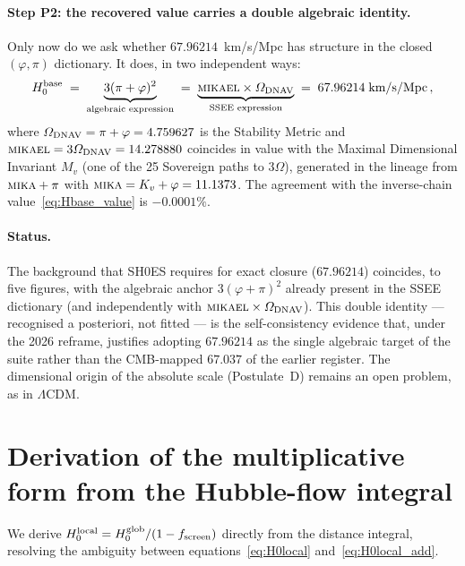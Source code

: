 \documentclass[12pt,a4paper]{article}
\newcommand{\phiG}{\varphi}
\newcommand{\fsc}{f_{\mathrm{screen}}}
\renewcommand{\Omega}{\varOmega}
\begin{document}
\paragraph{Step P2: the recovered value carries a double algebraic identity.}
Only now do we ask whether $67.96214$~km/s/Mpc has structure in the closed
$(\phiG,\pi)$ dictionary. It does, in two independent ways:
\begin{equation}
  H_0^{\rm base}
  \;=\; \underbrace{3(\pi+\phiG)^2}_{\text{algebraic expression}}
  \;=\; \underbrace{\textsc{mikael}\times\Omega_{\rm DNAV}}_{\text{SSEE expression}}
  \;=\; 67.96214\;\text{km/s/Mpc}\,,
  \label{eq:double_identity}
\end{equation}
where $\Omega_{\rm DNAV}=\pi+\phiG=4.759627$ is the Stability Metric and
$\textsc{mikael}=3\Omega_{\rm DNAV}=14.278880$ coincides in value with the Maximal
Dimensional Invariant $M_v$ (one of the 25 Sovereign paths to $3\Omega$), generated in
the lineage from $\textsc{mika}+\pi$ with $\textsc{mika}=K_v+\phiG=11.1373$. The agreement with
the inverse-chain value~\eqref{eq:Hbase_value} is $-0.0001\%$.

\paragraph{Status.}
The background that SH0ES requires for exact closure ($67.96214$) coincides, to
five figures, with the algebraic anchor $3(\phiG+\pi)^2$ already present in the
SSEE dictionary (and independently with $\textsc{mikael}\times\Omega_{\rm DNAV}$).
This double identity --- recognised a posteriori, not fitted --- is the
self-consistency evidence that, under the 2026 reframe, justifies adopting
$67.96214$ as the single algebraic target of the suite rather than the
CMB-mapped $67.037$ of the earlier register. The dimensional origin of the
absolute scale (Postulate~D) remains an open problem, as in $\Lambda$CDM.

\section{Derivation of the multiplicative form from the Hubble-flow integral}
\label{app:hubble_integral}

We derive $H_0^{\rm local} = H_0^{\rm glob}/(1-\fsc)$ directly from the distance
integral, resolving the ambiguity between equations~\eqref{eq:H0local}
and~\eqref{eq:H0local_add}.
\end{document}
